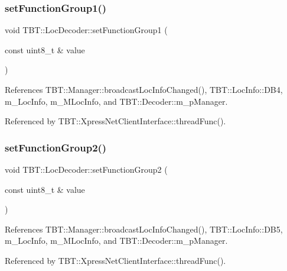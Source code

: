 \subsubsection{\texorpdfstring{set\+Function\+Group1()}{setFunctionGroup1()}}
{\footnotesize\ttfamily void T\+B\+T\+::\+Loc\+Decoder\+::set\+Function\+Group1 (\begin{DoxyParamCaption}\item[{const uint8\+\_\+t \&}]{value }\end{DoxyParamCaption})\hspace{0.3cm}{\ttfamily [inline]}}



References T\+B\+T\+::\+Manager\+::broadcast\+Loc\+Info\+Changed(), T\+B\+T\+::\+Loc\+Info\+::\+D\+B4, m\+\_\+\+Loc\+Info, m\+\_\+\+M\+Loc\+Info, and T\+B\+T\+::\+Decoder\+::m\+\_\+p\+Manager.



Referenced by T\+B\+T\+::\+Xpress\+Net\+Client\+Interface\+::thread\+Func().

\mbox{\label{classTBT_1_1LocDecoder_af021433df427aac432590da7be6393a8_af021433df427aac432590da7be6393a8}} 
\subsubsection{\texorpdfstring{set\+Function\+Group2()}{setFunctionGroup2()}}
{\footnotesize\ttfamily void T\+B\+T\+::\+Loc\+Decoder\+::set\+Function\+Group2 (\begin{DoxyParamCaption}\item[{const uint8\+\_\+t \&}]{value }\end{DoxyParamCaption})\hspace{0.3cm}{\ttfamily [inline]}}



References T\+B\+T\+::\+Manager\+::broadcast\+Loc\+Info\+Changed(), T\+B\+T\+::\+Loc\+Info\+::\+D\+B5, m\+\_\+\+Loc\+Info, m\+\_\+\+M\+Loc\+Info, and T\+B\+T\+::\+Decoder\+::m\+\_\+p\+Manager.



Referenced by T\+B\+T\+::\+Xpress\+Net\+Client\+Interface\+::thread\+Func().

\mbox{\label{classTBT_1_1LocDecoder_a81f9805d0a984a94dab529602ef9ae64_a81f9805d0a984a94dab529602ef9ae64}} 
